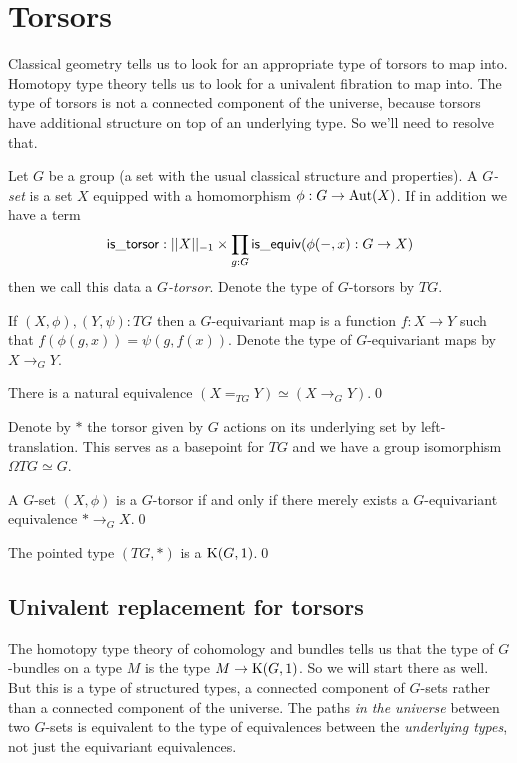 \section{Torsors}

Classical geometry tells us to look for an appropriate type of torsors to map into. Homotopy type theory tells us to look for a univalent fibration to map into. The type of torsors is not a connected component of the universe, because torsors have additional structure on top of an underlying type. So we'll need to resolve that.

\begin{mydef}
Let \( G \) be a group (a set with the usual classical structure and properties). A \emph{\( G \)-set} is a set \( X \) equipped with a homomorphism \( \phi:G\to\mathrm{Aut}(X) \). If in addition we have a term
\[ 
\mathsf{is\_torsor}:||X||_{-1}\times \prod_{g:G}\mathsf{is\_equiv}(\phi(-,x):G\to X)
\] then we call this data a \emph{\( G \)-torsor}. Denote the type of \( G \)-torsors by \( TG \).
\end{mydef}

If \( (X,\phi),(Y,\psi):TG \) then a \( G \)-equivariant map is a function \( f:X\to Y \) such that \( f(\phi(g,x))=\psi(g,f(x)) \). Denote the type of \( G \)-equivariant maps by \( X\to_G Y \).

\begin{mylemma}
There is a natural equivalence \( (X=_{TG}Y) \simeq (X\to_G Y) \).\qed
\end{mylemma}

Denote by \( * \) the torsor given by \( G \) actions on its underlying set by left-translation. This serves as a basepoint for \( TG \) and we have a group isomorphism \( \Omega TG\simeq G \).

\begin{mylemma}
A \( G \)-set \( (X,\phi) \) is a \( G \)-torsor if and only if there merely exists a \( G \)-equivariant equivalence \( *\to_G X \).\qed
\end{mylemma}

\begin{mycor}
The pointed type \( (TG,*) \) is a \( \mathrm{K}(G,1) \).\qed
\end{mycor}

\subsection{Univalent replacement for torsors}

The homotopy type theory of cohomology and bundles tells us that the type of \( G \)-bundles on a type \( M \) is the type \( M\to\mathrm{K}(G,1) \). So we will start there as well. But this is a type of structured types, a connected component of \( G \)-sets rather than a connected component of the universe. The paths \emph{in the universe} between two \( G \)-sets is equivalent to the type of equivalences between the \emph{underlying types}, not just the equivariant equivalences.


